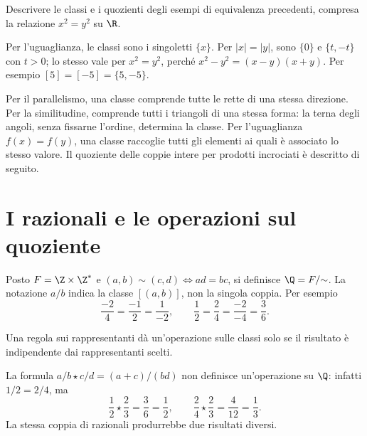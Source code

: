 \begin{esercizio}
Descrivere le classi e i quozienti degli esempi di equivalenza precedenti, compresa la relazione $x^2=y^2$ su $\R$.
\end{esercizio}
\begin{svolgimento}
Per l'uguaglianza, le classi sono i singoletti $\{x\}$. Per $|x|=|y|$, sono $\{0\}$ e $\{t,-t\}$ con $t>0$; lo stesso vale per $x^2=y^2$, perché $x^2-y^2=(x-y)(x+y)$. Per esempio $[5]=[-5]=\{5,-5\}$.

Per il parallelismo, una classe comprende tutte le rette di una stessa direzione. Per la similitudine, comprende tutti i triangoli di una stessa forma: la terna degli angoli, senza fissarne l'ordine, determina la classe. Per l'uguaglianza $f(x)=f(y)$, una classe raccoglie tutti gli elementi ai quali è associato lo stesso valore. Il quoziente delle coppie intere per prodotti incrociati è descritto di seguito.
\end{svolgimento}

\section{I razionali e le operazioni sul quoziente}
\begin{definizione}
Posto $F=\Z\times\Z^*$ e $(a,b)\sim(c,d)\iff ad=bc$, si definisce $\Q=F/{\sim}$. La notazione $a/b$ indica la classe $[(a,b)]$, non la singola coppia. Per esempio
\[
\frac{-2}{4}=\frac{-1}{2}=\frac{1}{-2},\qquad
\frac12=\frac24=\frac{-2}{-4}=\frac36.
\]
\end{definizione}

Una regola sui rappresentanti dà un'operazione sulle classi solo se il risultato è indipendente dai rappresentanti scelti.

\begin{esempio}
La formula $a/b\star c/d=(a+c)/(bd)$ non definisce un'operazione su $\Q$: infatti $1/2=2/4$, ma
\[
\frac12\star\frac23=\frac36=\frac12,\qquad
\frac24\star\frac23=\frac4{12}=\frac13.
\]
La stessa coppia di razionali produrrebbe due risultati diversi.
\end{esempio}

